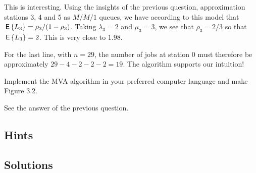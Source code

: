 \begin{exercise}
\begin{solution}
\begin{pyconsole}
\end{pyconsole}

This is interesting. Using the insights of the previous question,
approximation stations 3, 4 and 5 as $M/M/1$ queues, we have according
to this model that $\,\mathsf{E}\left\{ L_3\right\} = \rho_3/(1-\rho_3)$. Taking
$\lambda_3 = 2$ and $\mu_3 = 3$, we see that $\rho_3 = 2/3$ so that
$\,\mathsf{E}\left\{ L_3\right\} = 2$.  This is very close to $1.98$. 

For the last line, with $n=29$, the number of jobs at station 0 must
therefore be approximately $29-4-2-2-2 = 19$. The algorithm supports
our intuition!
\end{solution}
\end{exercise}

\begin{exercise}
  Implement the MVA algorithm in your preferred computer language and
  make Figure 3.2.
  \begin{solution}
    See the answer of the previous question.
  \end{solution}
\end{exercise}





\subsection*{Hints}

\subsection*{Solutions}

\clearpage
